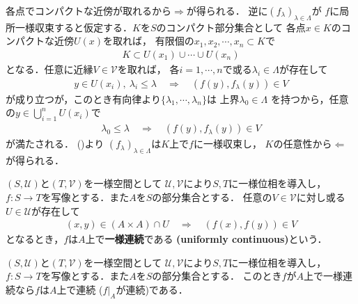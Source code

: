 	\begin{prf}
		各点でコンパクトな近傍が取れるから$\Longrightarrow$が得られる．
		逆に$(f_\lambda)_{\lambda \in \Lambda}$が
		$f$に局所一様収束すると仮定する．$K$を$S$のコンパクト部分集合として
		各点$x \in K$のコンパクトな近傍$U(x)$を取れば，
		有限個の$x_1,x_2,\cdots,x_n \subset K$で
		\begin{align}
			K \subset U(x_1) \cup \cdots \cup U(x_n)
			\label{eq:thm_compact_unif_conv_iff_locally_unif_conv_if_locally_compact}
		\end{align}
		となる．任意に近縁$V \in \mathscr{V}$を取れば，
		各$i = 1,\cdots,n$で或る$\lambda_i \in \Lambda$が存在して
		\begin{align}
			y \in U(x_i),\ \lambda_i \leq \lambda \quad \Longrightarrow \quad
			(f(y),f_\lambda(y)) \in V
		\end{align}
		が成り立つが，このとき有向律より$\{\lambda_1,\cdots,\lambda_n\}$は
		上界$\lambda_0 \in \Lambda$
		を持つから，任意の$y \in \bigcup_{i=1}^n U(x_i)$で
		\begin{align}
			\lambda_0 \leq \lambda \quad \Longrightarrow \quad
			(f(y),f_\lambda(y)) \in V
		\end{align}
		が満たされる．
		()より
		$(f_\lambda)_{\lambda \in \Lambda}$は$K$上で$f$に一様収束し，
		$K$の任意性から$\Longleftarrow$が得られる．
		\QED
	\end{prf}
	
	\begin{screen}
		\begin{dfn}[一様連続性]
			$(S,\mathscr{U})$と$(T,\mathscr{V})$を一様空間として
			$\mathscr{U},\mathscr{V}$により$S,T$に一様位相を導入し，
			$f:S \longrightarrow T$を写像とする．また$A$を$S$の部分集合とする．
			任意の$V \in \mathscr{V}$に対し或る$U \in \mathscr{U}$が存在して
			\begin{align}
				(x,y) \in (A \times A) \cap U 
				\quad \Longrightarrow \quad (f(x),f(y)) \in V
			\end{align}
			となるとき，$f$は$A$上で{\bf 一様連続}である
			{\bf (uniformly continuous)}という．
		\end{dfn}
	\end{screen}
	
	\begin{screen}
		\begin{thm}[一様連続なら連続]
			$(S,\mathscr{U})$と$(T,\mathscr{V})$を一様空間として
			$\mathscr{U},\mathscr{V}$により$S,T$に一様位相を導入し，
			$f:S \longrightarrow T$を写像とする．また$A$を$S$の部分集合とする．
			このとき$f$が$A$上で一様連続なら$f$は$A$上で連続
			($\left. f\right|_A$が連続)である．
		\end{thm}
	\end{screen}
	
